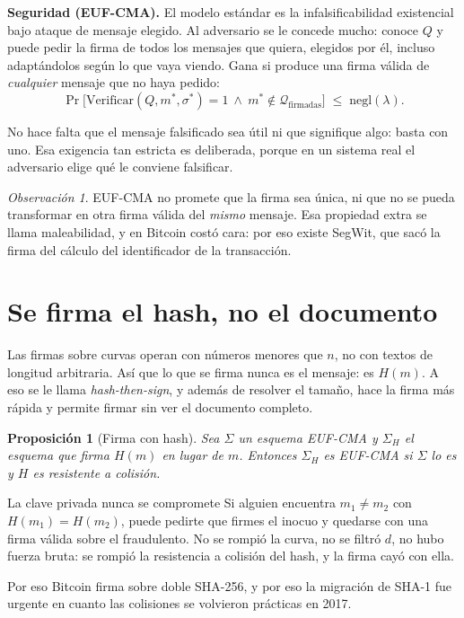 \documentclass[11pt,a4paper]{article}
\theoremstyle{definition}
\theoremstyle{plain}
\newtheorem{proposicion}{Proposición}
\theoremstyle{remark}
\newtheorem*{observacion}{Observación}
\begin{document}
\textbf{Seguridad (EUF-CMA).} El modelo estándar es la infalsificabilidad
existencial bajo ataque de mensaje elegido. Al adversario se le concede mucho:
conoce $Q$ y puede pedir la firma de todos los mensajes que quiera, elegidos por
él, incluso adaptándolos según lo que vaya viendo. Gana si produce una firma
válida de \emph{cualquier} mensaje que no haya pedido:
\[
  \Pr\bigl[\mathrm{Verificar}(Q, m^*, \sigma^*) = 1 \ \wedge\ m^* \notin \mathcal{Q}_{\text{firmadas}}\bigr]
  \;\le\; \mathrm{negl}(\lambda).
\]

No hace falta que el mensaje falsificado sea útil ni que signifique algo: basta
con uno. Esa exigencia tan estricta es deliberada, porque en un sistema real el
adversario elige qué le conviene falsificar.

\begin{observacion}
EUF-CMA no promete que la firma sea única, ni que no se pueda transformar en otra
firma válida del \emph{mismo} mensaje. Esa propiedad extra se llama
maleabilidad, y en Bitcoin costó cara: por eso existe SegWit, que sacó la firma
del cálculo del identificador de la transacción.
\end{observacion}

\section{Se firma el hash, no el documento}\label{sec:hash}

Las firmas sobre curvas operan con números menores que $n$, no con textos de
longitud arbitraria. Así que lo que se firma nunca es el mensaje: es $H(m)$. A
eso se le llama \emph{hash-then-sign}, y además de resolver el tamaño, hace la
firma más rápida y permite firmar sin ver el documento completo.

\begin{proposicion}[Firma con hash]
Sea $\Sigma$ un esquema EUF-CMA y $\Sigma_H$ el esquema que firma $H(m)$ en lugar
de $m$. Entonces $\Sigma_H$ es EUF-CMA si $\Sigma$ lo es \emph{y} $H$ es
resistente a colisión.
\end{proposicion}

\begin{aviso}{La clave privada nunca se compromete}
Si alguien encuentra $m_1 \ne m_2$ con $H(m_1) = H(m_2)$, puede pedirte que
firmes el inocuo y quedarse con una firma válida sobre el fraudulento. No se
rompió la curva, no se filtró $d$, no hubo fuerza bruta: se rompió la resistencia
a colisión del hash, y la firma cayó con ella.

Por eso Bitcoin firma sobre doble SHA-256, y por eso la migración de SHA-1 fue
urgente en cuanto las colisiones se volvieron prácticas en 2017.
\end{aviso}
\end{document}

